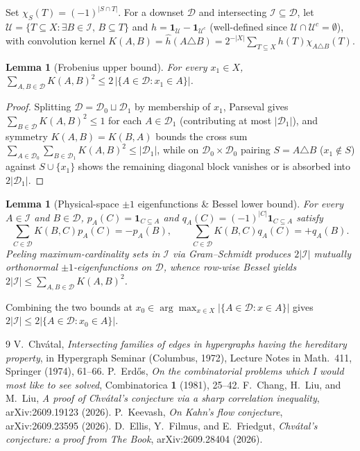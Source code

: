 \documentclass[11pt]{amsart}
\newtheorem{lemma}[theorem]{Lemma}
\begin{document}
Set $\chi_S(T) = (-1)^{|S \cap T|}$. For a downset $\mathcal{D}$ and intersecting $\mathcal{I} \subseteq \mathcal{D}$, let $\mathcal{U} = \{T \subseteq X : \exists B \in \mathcal{I},\, B \subseteq T\}$ and $h = \mathbf{1}_{\mathcal{U}} - \mathbf{1}_{\mathcal{U}^c}$ (well-defined since $\mathcal{U} \cap \mathcal{U}^c = \emptyset$), with convolution kernel $K(A, B) = \widehat{h}(A \triangle B) = 2^{-|X|}\sum_{T \subseteq X} h(T)\chi_{A \triangle B}(T)$.

\begin{lemma}[Frobenius upper bound]
For every $x_1 \in X$, $\sum_{A, B \in \mathcal{D}} K(A, B)^2 \le 2\,|\{A \in \mathcal{D} : x_1 \in A\}|$.
\end{lemma}

\begin{proof}
Splitting $\mathcal{D} = \mathcal{D}_0 \sqcup \mathcal{D}_1$ by membership of $x_1$, Parseval gives $\sum_{B \in \mathcal{D}} K(A, B)^2 \le 1$ for each $A \in \mathcal{D}_1$ (contributing at most $|\mathcal{D}_1|$), and symmetry $K(A, B) = K(B, A)$ bounds the cross sum $\sum_{A \in \mathcal{D}_0}\sum_{B \in \mathcal{D}_1} K(A, B)^2 \le |\mathcal{D}_1|$, while on $\mathcal{D}_0 \times \mathcal{D}_0$ pairing $S = A \triangle B$ ($x_1 \notin S$) against $S \cup \{x_1\}$ shows the remaining diagonal block vanishes or is absorbed into $2|\mathcal{D}_1|$.
\end{proof}

\begin{lemma}[Physical-space $\pm 1$ eigenfunctions \& Bessel lower bound]
For every $A \in \mathcal{I}$ and $B \in \mathcal{D}$, $p_A(C) = \mathbf{1}_{C \subseteq A}$ and $q_A(C) = (-1)^{|C|}\mathbf{1}_{C \subseteq A}$ satisfy
\[
  \sum_{C \in \mathcal{D}} K(B, C) p_A(C) = -p_A(B), \qquad \sum_{C \in \mathcal{D}} K(B, C) q_A(C) = +q_A(B).
\]
Peeling maximum-cardinality sets in $\mathcal{I}$ via Gram--Schmidt produces $2|\mathcal{I}|$ mutually orthonormal $\pm 1$-eigenfunctions on $\mathcal{D}$, whence row-wise Bessel yields $2|\mathcal{I}| \le \sum_{A, B \in \mathcal{D}} K(A, B)^2$.
\end{lemma}

Combining the two bounds at $x_0 \in \arg\max_{x \in X} |\{A \in \mathcal{D} : x \in A\}|$ gives $2|\mathcal{I}| \le 2|\{A \in \mathcal{D} : x_0 \in A\}|$.

\begin{thebibliography}{9}
 V.~Chv\'atal, \emph{Intersecting families of edges in hypergraphs having the hereditary property}, in Hypergraph Seminar (Columbus, 1972), Lecture Notes in Math.\ 411, Springer (1974), 61--66.
 P.~Erd\H{o}s, \emph{On the combinatorial problems which I would most like to see solved}, Combinatorica \textbf{1} (1981), 25--42.
 F.~Chang, H.~Liu, and M.~Liu, \emph{A proof of Chv\'atal's conjecture via a sharp correlation inequality}, arXiv:2609.19123 (2026).
 P.~Keevash, \emph{On Kahn's flow conjecture}, arXiv:2609.23595 (2026).
 D.~Ellis, Y.~Filmus, and E.~Friedgut, \emph{Chv\'atal's conjecture: a proof from The Book}, arXiv:2609.28404 (2026).
\end{thebibliography}
\end{document}
